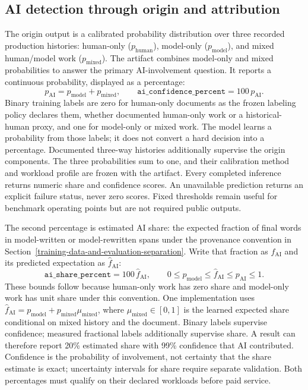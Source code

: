\subsection{AI detection through origin and attribution}\label{author-and-origin-detection}

The origin output is a calibrated probability distribution over three recorded
production histories: human-only (\(p_{\mathrm{human}}\)), model-only
(\(p_{\mathrm{model}}\)), and mixed human/model work (\(p_{\mathrm{mixed}}\)). The
artifact combines model-only and mixed probabilities to answer the primary
AI-involvement question. It reports a continuous probability, displayed as a
percentage:
\[
 p_{\mathrm{AI}} = p_{\mathrm{model}} + p_{\mathrm{mixed}},
 \qquad
 \texttt{ai\_confidence\_percent} = 100\,p_{\mathrm{AI}}.
\]
Binary training labels are zero for human-only documents as the frozen
labeling policy declares them, whether documented human-only work or a
historical-human proxy, and one for model-only or mixed work. The model learns a probability from those labels;
it does not convert a hard decision into a percentage. Documented three-way
histories additionally supervise the origin components. The three probabilities
sum to one, and their calibration method and workload profile are frozen with
the artifact. Every completed inference returns numeric share and confidence
scores. An unavailable prediction returns an explicit failure status, never
zero scores. Fixed
thresholds remain useful for benchmark operating points but are not required
public outputs.

The second percentage is estimated AI share: the expected fraction of final
words in model-written or model-rewritten spans under the provenance convention
in Section~\ref{training-data-and-evaluation-separation}. Write that fraction
as \(f_{\mathrm{AI}}\) and its predicted expectation as \(\hat f_{\mathrm{AI}}\):
\[
 \texttt{ai\_share\_percent}=100\,\hat f_{\mathrm{AI}},
 \qquad 0\leq p_{\mathrm{model}}\leq\hat f_{\mathrm{AI}}\leq p_{\mathrm{AI}}\leq1.
\]
These bounds follow because human-only work has zero share and model-only
work has unit share under this convention. One implementation uses
\(\hat f_{\mathrm{AI}}=p_{\mathrm{model}}+p_{\mathrm{mixed}}\mu_{\mathrm{mixed}}\),
where \(\mu_{\mathrm{mixed}}\in[0,1]\) is the learned expected share conditional
on mixed history and the document. Binary labels supervise confidence; measured
fractional labels additionally supervise share. A result can therefore report
20\% estimated share with 99\% confidence that AI contributed. Confidence is
the probability of involvement, not certainty that the share estimate is exact;
uncertainty intervals for share require separate validation. Both percentages
must qualify on their declared workloads before paid service.

